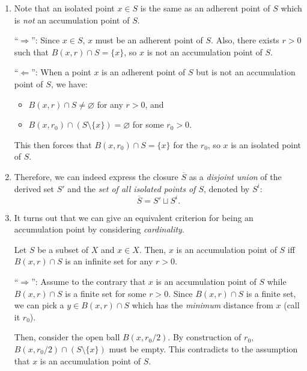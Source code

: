 \begin{enumerate}
\item \label{it:isolated-point-equiv-def} Note that an isolated point \(x\in
S\) is the same as an adherent point of \(S\) which is \emph{not} an
accumulation point of \(S\).

\begin{pf}
``\(\Rightarrow\)'': Since \(x\in S\), \(x\) must be an adherent point of
\(S\). Also, there exists \(r>0\) such that \(B(x,r)\cap S=\{x\}\), so \(x\) is
not an accumulation point of \(S\).

``\(\Leftarrow\)'': When a point \(x\) is an adherent point of \(S\) but is not
an accumulation point of \(S\), we have:
\begin{itemize}
\item \(B(x,r)\cap S\ne\varnothing\) for any \(r>0\), and
\item \(B(x,r_0)\cap (S\setminus\{x\})=\varnothing\) for some \(r_0>0\).
\end{itemize}
This then forces that \(B(x,r_0)\cap S=\{x\}\) for the \(r_0\), so \(x\) is an
isolated point of \(S\).
\end{pf}

\item\label{it:closure-decompose-acc-isolate} Therefore, we can indeed express
the closure \(\overline{S}\) as a \emph{disjoint union} of the derived set
\(S'\) and the \emph{set of all isolated points of \(S\)}, denoted by \(S^i\):
\[
\overline{S}=S'\sqcup S^{i}.
\]

\item It turns out that we can give an equivalent criterion for being an
accumulation point by considering \emph{cardinality}.
\begin{proposition}
\label{prp:acc-pt-inf-set}
Let \(S\) be a subset of \(X\) and \(x\in X\). Then, \(x\) is an accumulation
point of \(S\) iff \(B(x,r)\cap S\) is an infinite set for any \(r>0\).
\end{proposition}
\begin{pf}
``\(\Rightarrow\)'': Assume to the contrary that \(x\) is an accumulation point
of \(S\) while \(B(x,r)\cap S\) is a finite set for some \(r>0\). Since
\(B(x,r)\cap S\) is a finite set, we can pick a \(y\in B(x,r)\cap S\) which has
the \emph{minimum} distance from \(x\) (call it \(r_0\)).

Then, consider the open ball \(B(x,r_0/2)\). By construction of \(r_0\),
\(B(x,r_0/2)\cap (S\setminus\{x\})\) must be empty. This contradicts to the
assumption that \(x\) is an accumulation point of \(S\).


\end{pf}
\end{enumerate}
